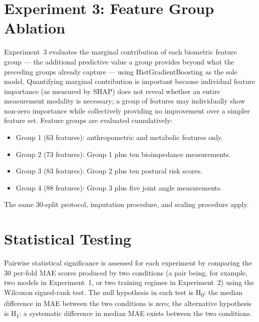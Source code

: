 \documentclass[11pt,a4paper]{report}
\begin{document}
\section{Experiment 3: Feature Group Ablation}

Experiment~3 evaluates the marginal contribution of each biometric feature group --- the additional
predictive value a group provides beyond what the preceding groups already capture --- using
HistGradientBoosting as the sole model. Quantifying marginal contribution is important because
individual feature importance (as measured by SHAP) does not reveal whether an entire measurement
modality is necessary; a group of features may individually show non-zero importance while
collectively providing no improvement over a simpler feature set. Feature groups are evaluated cumulatively:

\begin{itemize}
  \item Group 1 (63 features): anthropometric and metabolic features only.
  \item Group 2 (73 features): Group 1 plus ten bioimpedance measurements.
  \item Group 3 (83 features): Group 2 plus ten postural risk scores.
  \item Group 4 (88 features): Group 3 plus five joint angle measurements.
\end{itemize}

The same 30-split protocol, imputation procedure, and scaling procedure apply.

\section{Statistical Testing}

Pairwise statistical significance is assessed for each experiment by comparing the 30 per-fold MAE scores produced by two conditions (a pair being, for example, two models in Experiment~1, or two training regimes in Experiment~2) using the Wilcoxon signed-rank test. The null hypothesis in each test is H\textsubscript{0}: the median difference in MAE between the two conditions is zero; the alternative hypothesis is H\textsubscript{1}: a systematic difference in median MAE exists between the two conditions.
\end{document}
